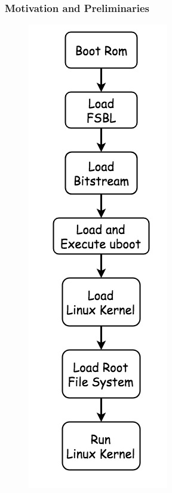 \documentclass{beamer}
\begin{document}
\begin{frame}
\frametitle{\textcolor[rgb]{0.5,0.5,0.3}{Motivation} and Preliminaries}
\begin{figure}
\raggedleft\includegraphics[scale=0.2]{image/linux_boot_stage.jpg}
\end{figure}
\begin{figure}

\end{figure}
\end{frame}
\end{document}
